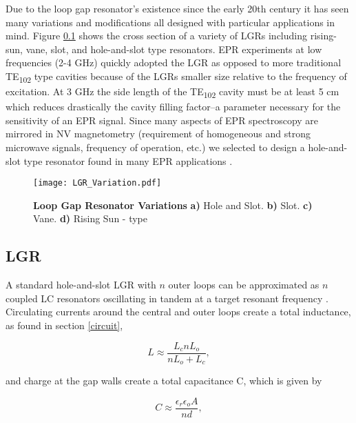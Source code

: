 Due to the loop gap resonator's existence since the early 20th century \cite{collins1948microwave} it has seen many variations and modifications all designed with particular applications in mind. Figure \ref{} shows the cross section of a variety of LGRs including rising-sun, vane, slot, and hole-and-slot type resonators. EPR experiments at low frequencies (2-4 GHz) quickly adopted the LGR as opposed to more traditional TE\textsubscript{102} type cavities because of the LGRs smaller size relative to the frequency of excitation. At 3 GHz the side length of the TE\textsubscript{102} cavity must be at least 5 cm which reduces drastically the cavity filling factor--a parameter necessary for the sensitivity of an EPR signal. Since many aspects of EPR spectroscopy are mirrored in NV magnetometry (requirement of homogeneous and strong microwave signals, frequency of operation, etc.) we selected to design a hole-and-slot type resonator found in many EPR applications \cite{}.  
\vspace{5mm}
\begin{figure}[h!]
\centering
\texttt{[image: LGR\_Variation.pdf]}  
\caption{\textbf{Loop Gap Resonator Variations} \textbf{a)} Hole and Slot. \textbf{b)} Slot. \textbf{c)} Vane. \textbf{d)} Rising Sun - type}
\label{LGR_variation}
\end{figure}


\subsection{LGR}

A standard hole-and-slot LGR with $n$ outer loops can be approximated as $n$ coupled LC resonators oscillating in tandem at a target resonant frequency \cite{wood1984loop}. Circulating currents around the central and outer loops create a total inductance, as found in section \ref{circuit}, 


\begin{equation}
L \approx \frac{L_c n L_o}{n L_o + L_c},
\end{equation}\label{induct}

and charge at the gap walls create a total capacitance C, which is given by

\begin{equation}
C \approx \frac{\epsilon_r \epsilon_o A}{nd},
\end{equation} \label{cap}

